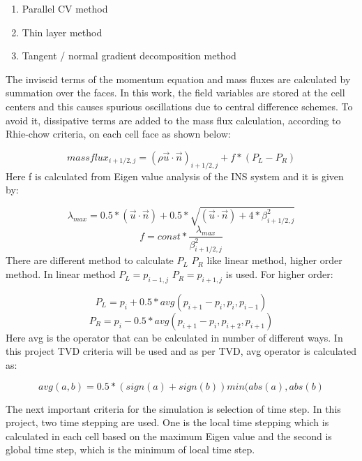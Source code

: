 \documentclass[12pt]{elsarticle}
\begin{document}
	\begin{enumerate}
		\item Parallel CV method
		\item Thin layer method
		\item Tangent / normal gradient decomposition method
	\end{enumerate}
	
	The inviscid terms of the momentum equation and mass fluxes are calculated by summation over the faces. In this work, the field variables are stored at the cell centers and this causes spurious oscillations due to central difference schemes. To avoid it, dissipative terms are added to the mass flux calculation, according to Rhie-chow criteria, on each cell face as shown below:
	
	\begin{equation}
		massflux_{i+1/2,j}= (\rho \overrightarrow{u} \cdot \overrightarrow{n})_{i+1/2,j} +f* (P_L-P_R)
	\end{equation} 
	Here f is calculated from Eigen value analysis of the INS system and it is given by:
	
	\begin{equation}
		\lambda_{max}=0.5*(\overrightarrow{u} \cdot \overrightarrow{n})+0.5*\sqrt{(\overrightarrow{u} \cdot \overrightarrow{n})+4*\beta_{i+1/2,j}^2} 
	\end{equation}
	\begin{equation}
		f=const*\frac{\lambda_{max}}{\beta_{i+1/2,j}^2} 
	\end{equation}
	There are different method to calculate $P_L$ $P_R$ like linear method, higher order method. In linear method $P_L =p_{i-1,j}$ $P_R=p_{i+1,j}$ is used. For higher order:
	
	\begin{equation}
		P_L=p_i+0.5*avg(p_{i+1}-p_i,p_i,p_{i-1})
	\end{equation}
	\begin{equation}
		P_R=p_i-0.5*avg(p_{i+1}-p_i,p_{i+2},p_{i+1})
	\end{equation}
	Here avg is the operator that can be calculated in number of different ways. In this project TVD criteria will be used and as per TVD, avg operator is calculated as:
	
	\begin{equation}
		avg(a,b)=0.5*(sign(a)+sign(b))min(abs(a),abs(b)
	\end{equation}
	
	The next important criteria for the simulation is selection of time step. In this project, two time stepping are used. One is the local time stepping which is calculated in each cell based on the maximum Eigen value and the second is global time step, which is the minimum of local time step.
	
\end{document}
